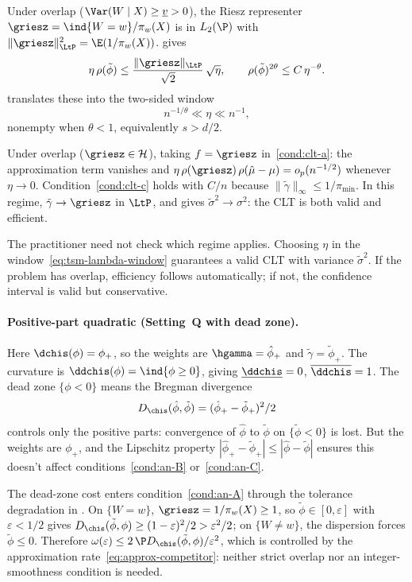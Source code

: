 \documentclass{article}
\begin{document}
Under overlap ($\Var(W \mid X) \ge \underline{v} > 0$),
the Riesz representer $\griesz = \ind{W=w}/\pi_w(X)$
is in $L_2(\P)$
with $\|\griesz\|_{\LtP}^2 = \E(1/\pi_w(X))$.
 gives
\begin{equation}\label{eq:tsm-balance-bounds}
\eta\,\rho(\tilde\phi)
  \le \frac{\|\griesz\|_{\LtP}}{\sqrt{2}}\,\sqrt{\eta},
\qquad
\rho(\tilde\phi)^{2\theta}
  \le C\,\eta^{-\theta}.
\end{equation}
translates these into the two-sided window
\begin{equation}
\label{eq:tsm-lambda-window}
n^{-1/\theta} \ll \eta
  \ll n^{-1},
\end{equation}
nonempty when $\theta < 1$,
equivalently $s > d/2$.


Under overlap ($\griesz \in \mathcal{H}$),
taking $f = \griesz$ in~\ref{cond:clt-a}:
the approximation term vanishes
and $\eta\,\rho(\griesz)\,\rho(\hat\mu-\mu)
  = o_p(n^{-1/2})$
whenever $\eta \to 0$.
Condition~\ref{cond:clt-c} holds with $C/n$
because $\|\tilde\gamma\|_\infty \le 1/\pi_{\min}$.
In this regime,
$\tilde\gamma \to \griesz$ in $\LtP$,
and  gives
$\tilde\sigma^2 \to \sigma^2$:
the CLT is both valid and efficient.

The practitioner need not check
which regime applies.
Choosing $\eta$
in the window~\eqref{eq:tsm-lambda-window}
guarantees a valid CLT
with variance $\tilde\sigma^2$.
If the problem has overlap,
efficiency follows automatically;
if not, the confidence interval
is valid but conservative.

\paragraph{Positive-part quadratic (Setting~Q with dead zone).}
Here $\dchis(\phi) = \phi_+$,
so the weights are $\hgamma = \hat\phi_+$
and $\tilde\gamma = \tilde\phi_+$.
The curvature is $\ddchis(\phi) = \ind{\phi \ge 0}$,
giving $\underline{\ddchis} = 0$, $\overline{\ddchis} = 1$.
The dead zone $\{\phi < 0\}$
means the Bregman divergence
\[
D_{\chis}(\hat\phi, \tilde\phi)
  = (\hat\phi_+ - \tilde\phi_+)^2/2
\]
controls only the positive parts:
convergence of $\hat\phi$ to $\tilde\phi$
on $\{\tilde\phi < 0\}$ is lost.
But the weights are $\phi_+$,
and the Lipschitz property
$|\hat\phi_+ - \tilde\phi_+| \le |\hat\phi - \tilde\phi|$
ensures this doesn't affect conditions~\ref{cond:an-B} or~\ref{cond:an-C}.

The dead-zone cost enters condition~\ref{cond:an-A}
through the tolerance degradation
in .
On $\{W = w\}$,
$\griesz = 1/\pi_w(X) \ge 1$,
so $\tilde\phi \in [0,\varepsilon]$
with $\varepsilon < 1/2$
gives $D_{\chis}(\tilde\phi, \phi)
  \ge (1 - \varepsilon)^2/2 > \varepsilon^2/2$;
on $\{W \ne w\}$,
the dispersion forces $\tilde\phi \le 0$.
Therefore $\omega(\varepsilon)
  \le 2\,\P D_{\chis}(\tilde\phi, \phi)/\varepsilon^2$,
which is controlled
by the approximation rate~\eqref{eq:approx-competitor}:
neither strict overlap
nor an integer-smoothness condition is needed.
\end{document}
